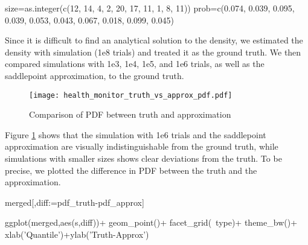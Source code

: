 \begin{example}
size=as.integer(c(12, 14, 4, 2, 20, 17, 11, 1, 8, 11))
prob=c(0.074, 0.039, 0.095, 0.039, 0.053, 0.043, 0.067, 0.018, 0.099, 0.045)
\end{example}

Since it is difficult to find an analytical solution to the density, we estimated the density with simulation (1e8 trials) and treated it as the ground truth. We then compared simulations with 1e3, 1e4, 1e5, and 1e6 trials, as well as the saddlepoint approximation, to the ground truth. 


\begin{figure}[ht]
\texttt{[image: health\_monitor\_truth\_vs\_approx\_pdf.pdf]}
\caption{Comparison of PDF between truth and approximation}
\label{fig:5}
\end{figure}

Figure \ref{fig:5} shows that the simulation with 1e6 trials and the saddlepoint approximation are visually indistinguishable from the ground truth, while simulations with smaller sizes shows clear deviations from the truth. To be precise, we plotted the difference in PDF between the truth and the approximation.

\begin{example}
merged[,diff:=pdf_truth-pdf_approx]

ggplot(merged,aes(s,diff))+
	geom_point()+
	facet_grid(~type)+
	theme_bw()+
	xlab('Quantile')+ylab('Truth-Approx')
\end{example}


